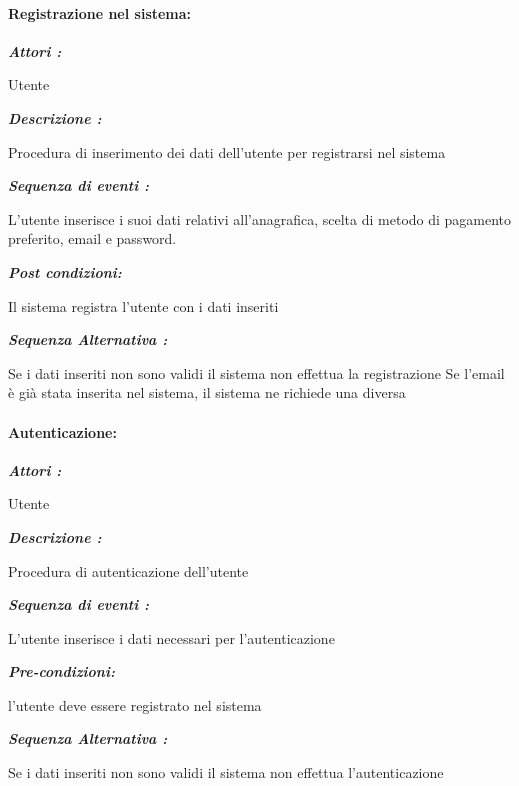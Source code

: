\documentclass{article}
\begin{document}
\newpage


\paragraph{Registrazione nel sistema:}

\begin{mdframed}

	\noindent\textit{\textbf{Attori :}}


	Utente

	\noindent\textit{\textbf{Descrizione :}}


	Procedura di inserimento dei dati dell’utente per registrarsi nel
	sistema

	\noindent\textit{\textbf{Sequenza di eventi :}}


	L’utente inserisce i suoi dati relativi all'anagrafica,
	scelta di metodo di pagamento preferito, email e password.

	\noindent\textit{\textbf{Post condizioni:}}


	Il sistema registra l’utente con i dati inseriti

	\noindent\textit{\textbf{Sequenza Alternativa :}}


	Se i dati inseriti non sono validi il sistema non effettua la
	registrazione
	Se l'email è già stata inserita nel sistema,
	il sistema ne richiede una diversa
\end{mdframed}

\paragraph{Autenticazione:}
\begin{mdframed}

	\noindent\textit{\textbf{Attori :}}


	Utente

	\noindent\textit{\textbf{Descrizione :}}


	Procedura di autenticazione dell'utente

	\noindent\textit{\textbf{Sequenza di eventi :}}


	L’utente inserisce i dati necessari per l'autenticazione

	\noindent\textit{\textbf{Pre-condizioni:}}


	l'utente deve essere registrato nel sistema

	\noindent\textit{\textbf{Sequenza Alternativa :}}


	Se i dati inseriti non sono validi il sistema non effettua
	l'autenticazione

\end{mdframed}
\newpage
\end{document}
